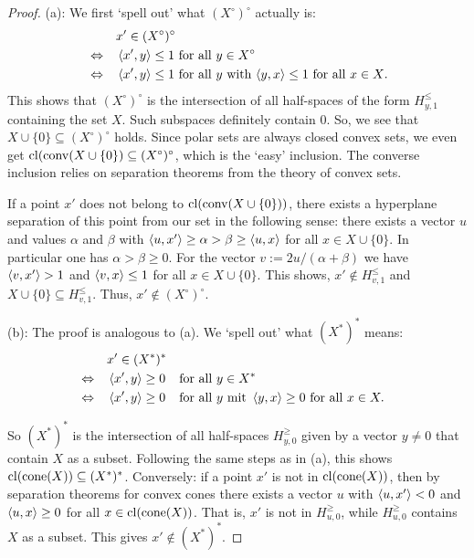 \begin{proof}
	(a): We first `spell out' what $(X^\circ)^\circ$ actually is: 
	\begin{align*}
		& & & x' \in (X^\circ)^\circ 
		\\ &\Leftrightarrow & & 
		\sprod{x'}{y} \le 1 \ \text{for all} \  y \in X^\circ
		\\ &\Leftrightarrow & & \sprod{x'}{y} \le 1 \ \text{for all $y$ with $\sprod{y}{x} \le 1$ \text{for all} $x \in X$}. 
	\end{align*}
	This shows that $(X^\circ)^\circ$ is the intersection of all half-spaces of the form $H_{y,1}^\le$ containing the set $X$. Such subspaces definitely contain $0$. So, we see that $X \cup \{0\} \subseteq (X^\circ)^\circ$ holds. Since polar sets are always closed convex sets, we even get $\operatorname{cl}(\operatorname{conv}(X \cup \{0\}) \subseteq (X^\circ)^\circ$, which is the `easy' inclusion. The converse inclusion relies on separation theorems from the theory of convex sets. 
	
	If a point $x'$ does not belong to $\operatorname{cl}(\operatorname{conv}(X \cup \{0\}))$, there exists a hyperplane separation of this point from our set in the following sense: there exists a vector $u$ and values $\alpha $ and $\beta$ with  $\left\langle u , x' \right\rangle \ge \alpha > \beta \ge \left\langle u , x \right\rangle$ for all $x \in X \cup \{0\}$. In particular one has $\alpha > \beta \ge 0$. For the vector $v := 2 u / (\alpha + \beta)$ we have $\left\langle v , x' \right\rangle > 1$ and $\left\langle v , x \right\rangle \le 1$ for all $x \in X \cup \{0\}$. This shows, $x'\not\in H_{v,1}^\le$ and $X \cup \{0\} \subseteq H_{v,1}^\le$. Thus, $x' \not \in (X^\circ)^\circ$.
	

	(b): The proof is analogous to (a). We `spell out' what $(X^\ast)^\ast$ means: 
	\begin{align*}
		&& &x' \in (X^\ast)^\ast
		\\ &\Leftrightarrow & &\left\langle x' , y \right\rangle \ge 0 & &\text{for all} \ y \in X^\ast
		\\ &\Leftrightarrow & & \left\langle x' , y \right\rangle \ge 0 & & \text{for all} \ y \ \text{mit} \ \left\langle y , x \right\rangle \ge 0 \text{ for all } x \in X.
	\end{align*}
	
	So $(X^\ast)^\ast$ is the intersection of all half-spaces $H_{y,0}^\ge $ given by a vector $y \ne 0$ that contain $X$ as a subset. Following the same steps as in (a), this shows $\operatorname{cl}(\operatorname{cone}(X)) \subseteq (X^\ast)^\ast$. Conversely: if a point $x'$ is not in $\operatorname{cl}(\operatorname{cone}(X))$, then by separation theorems for convex cones there exists a vector $u$ with $\left\langle u , x' \right\rangle < 0$ and $\left\langle u , x \right\rangle \ge 0$ for all $x \in \operatorname{cl}(\operatorname{cone}(X))$. That is, $x'$ is not in $H_{u,0}^\ge$, while $H_{u,0}^\ge $ contains $X$ as a subset. This gives $x' \not \in (X^\ast)^\ast$. 
\end{proof}



